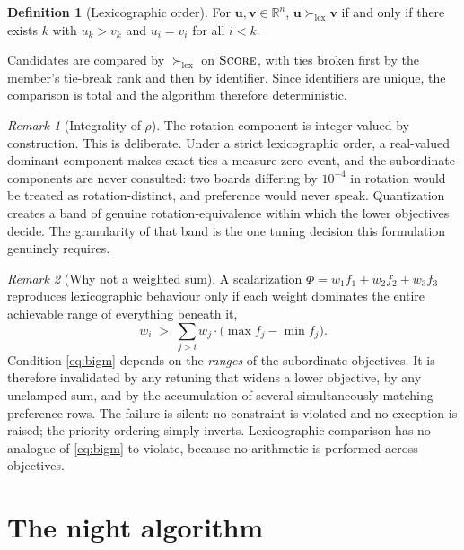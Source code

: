 \documentclass[11pt,a4paper]{article}
\theoremstyle{definition}
\newtheorem{definition}{Definition}
\theoremstyle{remark}
\newtheorem{remark}{Remark}
\newcommand{\score}{\textsc{Score}}
\newcommand{\lex}{\succ_{\mathrm{lex}}}
\begin{document}
\begin{definition}[Lexicographic order]
For $\mathbf{u}, \mathbf{v} \in \mathbb{R}^n$, $\mathbf{u} \lex \mathbf{v}$
if and only if there exists $k$ with $u_k > v_k$ and $u_i = v_i$ for all
$i < k$.
\end{definition}

Candidates are compared by $\lex$ on $\score$, with ties broken first by the
member's tie-break rank and then by identifier. Since identifiers are
unique, the comparison is total and the algorithm therefore deterministic.

\begin{remark}[Integrality of $\rho$]
\label{rem:quantize}
The rotation component is integer-valued by construction. This is
deliberate. Under a strict lexicographic order, a real-valued dominant
component makes exact ties a measure-zero event, and the subordinate
components are never consulted: two boards differing by $10^{-4}$ in
rotation would be treated as rotation-distinct, and preference would never
speak. Quantization creates a band of genuine rotation-equivalence within
which the lower objectives decide. The granularity of that band is the one
tuning decision this formulation genuinely requires.
\end{remark}

\begin{remark}[Why not a weighted sum]
\label{rem:bigm}
A scalarization $\Phi = w_1 f_1 + w_2 f_2 + w_3 f_3$ reproduces
lexicographic behaviour only if each weight dominates the entire achievable
range of everything beneath it,
\begin{equation}
\label{eq:bigm}
w_i \;>\; \sum_{j > i} w_j \cdot \bigl(\max f_j - \min f_j\bigr) .
\end{equation}
Condition \eqref{eq:bigm} depends on the \emph{ranges} of the subordinate
objectives. It is therefore invalidated by any retuning that widens a lower
objective, by any unclamped sum, and by the accumulation of several
simultaneously matching preference rows. The failure is silent: no
constraint is violated and no exception is raised; the priority ordering
simply inverts. Lexicographic comparison has no analogue of
\eqref{eq:bigm} to violate, because no arithmetic is performed across
objectives.
\end{remark}

\section{The night algorithm}
\label{sec:night}
\end{document}
